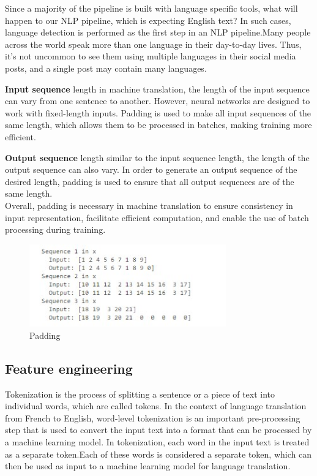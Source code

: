 \documentclass{article}
\begin{document}
Since a majority of the pipeline is built with language specific tools, what will happen to our NLP pipeline, which is expecting English text? In such cases, language detection is performed as the first step in an NLP pipeline.Many people across the world speak more than one language in their day-to-day lives. Thus, it's not uncommon to see them using multiple languages in their social media posts, and a single post may contain many languages.

\textbf{Input sequence} length in machine translation, the length of the input sequence can vary from one sentence to another. However, neural networks are designed to work with fixed-length inputs. Padding is used to make all input sequences of the same length, which allows them to be processed in batches, making training more efficient.

\textbf{Output sequence }length similar to the input sequence length, the length of the output sequence can also vary. In order to generate an output sequence of the desired length, padding is used to ensure that all output sequences are of the same length.\\
Overall, padding is necessary in machine translation to ensure consistency in input representation, facilitate efficient computation, and enable the use of batch processing during training.


\begin{figure}[htp]
    \centering
    \includegraphics[width=8.5cm]{4.jpg}
    \caption{Padding}
    \label{fig:galaxy}
\end{figure}

\subsection{Feature engineering}

Tokenization is the process of splitting a sentence or a piece of text into individual words, which are called tokens. In the context of language translation from French to English, word-level tokenization is an important pre-processing step that is used to convert the input text into a format that can be processed by a machine learning model. In tokenization, each word in the input text is treated as a separate token.Each of these words is considered a separate token, which can then be used as input to a machine learning model for language translation.
\end{document}

